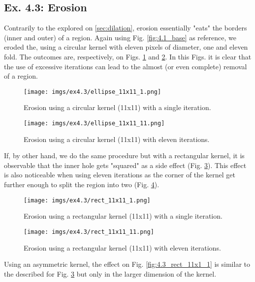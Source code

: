 \documentclass[journal]{IEEEtran}
\begin{document}
\subsection{Ex. 4.3: Erosion}

Contrarily to the explored on \ref{sec:dilation}, erosion essentially "eats" the borders (inner and outer) of a region. Again using Fig. \ref{fig:4.1_base} as reference, we eroded the, using a circular kernel with eleven pixels of diameter, one and eleven fold. The outcomes are, respectively, on Figs. \ref{fig:4.3_ellipse_11x11_1} and \ref{fig:4.3_ellipse_11x11_11}. In this Figs. it is clear that the use of excessive iterations can lead to the almost (or even complete) removal of a region. 

\begin{figure}[htp]
  \centering
  \texttt{[image: imgs/ex4.3/ellipse\_11x11\_1.png]}
  \caption{Erosion using a circular kernel (11x11) with a single iteration.}
  \label{fig:4.3_ellipse_11x11_1}
\end{figure}
\FloatBarrier

\begin{figure}[htp]
  \centering
  \texttt{[image: imgs/ex4.3/ellipse\_11x11\_11.png]}
  \caption{Erosion using a circular kernel (11x11) with eleven iterations.}
  \label{fig:4.3_ellipse_11x11_11}
\end{figure}
\FloatBarrier

If, by other hand, we do the same procedure but with a rectangular kernel, it is observable that the inner hole gets "squared" as a side effect (Fig. \ref{fig:4.3_rect_11x11_1}). This effect is also noticeable when using eleven iterations as the corner of the kernel get further enough to split the region into two (Fig. \ref{fig:4.3_rect_11x11_11}).

\begin{figure}[htp]
  \centering
  \texttt{[image: imgs/ex4.3/rect\_11x11\_1.png]}
  \caption{Erosion using a rectangular kernel (11x11) with a single iteration.}
  \label{fig:4.3_rect_11x11_1}
\end{figure}
\FloatBarrier

\begin{figure}[htp]
  \centering
  \texttt{[image: imgs/ex4.3/rect\_11x11\_11.png]}
  \caption{Erosion using a rectangular kernel (11x11) with eleven iterations.}
  \label{fig:4.3_rect_11x11_11}
\end{figure}
\FloatBarrier

Using an asymmetric kernel, the effect on Fig. \ref{fig:4.3_rect_11x1_1} is similar to the described for Fig. \ref{fig:4.3_rect_11x11_1} but only in the larger dimension of the kernel.
\end{document}
